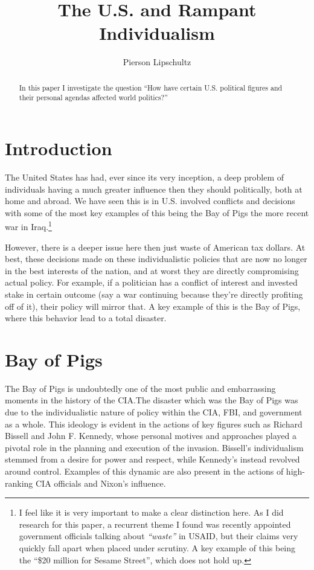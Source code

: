 \documentclass[12pt]{article}
\title{The U.S. and Rampant Individualism }
\author{Pierson Lipschultz}
\begin{document}
\maketitle

\begin{abstract}
    In this paper I investigate the question ``How have certain U.S. political figures and their personal agendas affected world politics?''
\end{abstract}

\section{Introduction}

    The United States has had, ever since its very inception, a deep problem of individuals having a much greater influence then they should politically, both at home and abroad. We have seen this is in U.S. involved conflicts and decisions with some of the most key examples of this being the Bay of Pigs the more recent war in Iraq.\footnote{I feel like it is very important to make a clear distinction here. As I did research for this paper, a recurrent  theme I found was recently appointed government officials talking about \textit{``waste''} in USAID, but their claims very quickly fall apart when placed under scrutiny. A key example of this being the ``\$20 million for Sesame Street'', which does not hold up.} 

    However, there is a deeper issue here then just waste of American tax dollars. At best, these decisions made on these individualistic policies that are now no longer in the best interests of the nation, and at worst they are directly compromising actual policy. For example, if a politician has a conflict of interest and invested stake in certain outcome (say a war continuing because they're directly profiting off of it), their policy will mirror that. A key example of this is the Bay of Pigs, where this behavior lead to a total disaster.

\section{Bay of Pigs}

    The Bay of Pigs is undoubtedly one of the most public and embarrassing moments in the history of the CIA.\@ The disaster which was the Bay of Pigs was due to the individualistic nature of policy within the CIA, FBI, and government as a whole. This ideology is evident in the actions of key figures such as Richard Bissell and John F. Kennedy, whose personal motives and approaches played a pivotal role in the planning and execution of the invasion. Bissell's individualism stemmed from a desire for power and respect, while Kennedy's instead revolved around control. Examples of this dynamic are also present in the actions of high-ranking CIA officials and Nixon's influence.~\parencite{JeffreysJones2003}
\end{document}

